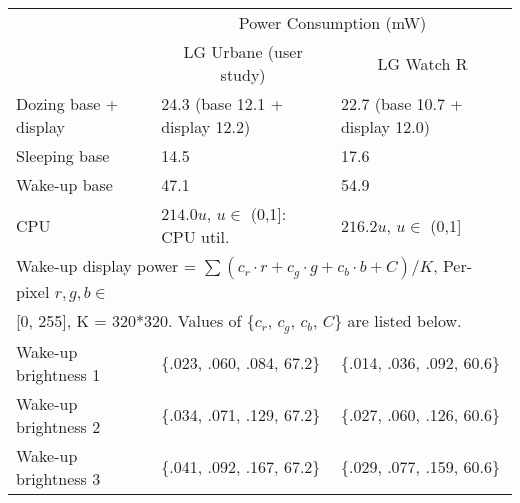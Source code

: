 \begin{table*}[t]
\centering
    \begin{footnotesize}
				\begin{tabular}{l|l|l}
				\multicolumn{1}{c}{\MR{Component}}               & \multicolumn{2}{|c}{Power Consumption (mW) } \\ \cline{2-3}
				                             & \multicolumn{1}{c}{LG Urbane (user study)}    &   \multicolumn{1}{|c}{LG Watch R}             \\
				\hline
				Dozing base + display        &  24.3 (base 12.1 + display 12.2)              &   22.7 (base 10.7 + display 12.0)             \\
				Sleeping base                   &  14.5                                         &   17.6                                       \\
				Wake-up base                 &  47.1                                         &   54.9                                        \\
				\hline
				CPU                          &  $214.0u$, $u \in$ (0,1]: CPU util.           &   $216.2u$, $u \in$ (0,1]                     \\
				\hline
				\multicolumn{3}{l}{Wake-up display power = $\sum{(c_r \cdot r+c_g \cdot g+c_b \cdot b+C)/K}$, Per-pixel $r,g,b \in$} \\
				\multicolumn{3}{l}{[0, 255], K = 320*320. Values of \{$c_r$, $c_g$, $c_b$, $C$\} are listed below.} \\
				\hline
				Wake-up brightness 1        & \{.023, .060, .084, 67.2\}                    &   \{.014, .036, .092, 60.6\}                 \\
				Wake-up brightness 2        & \{.034, .071, .129, 67.2\}                    &   \{.027, .060, .126, 60.6\}                 \\
				Wake-up brightness 3        & \{.041, .092, .167, 67.2\}                    &   \{.029, .077, .159, 60.6\}                 \\

\end{tabular}
\end{footnotesize}
\end{table*}
